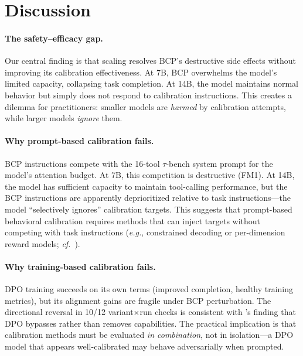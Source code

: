 \documentclass[11pt,a4paper]{article}
\newcommand{\taubench}{$\tau$-bench}
\newcommand{\eg}{\textit{e.g.}}
\newcommand{\cf}{\textit{cf.}}
\begin{document}
\section{Discussion}
\label{sec:discussion}

\paragraph{The safety--efficacy gap.}
Our central finding is that scaling resolves BCP's destructive side effects without improving its calibration effectiveness.
At 7B, BCP overwhelms the model's limited capacity, collapsing task completion.
At 14B, the model maintains normal behavior but simply does not respond to calibration instructions.
This creates a dilemma for practitioners: smaller models are \emph{harmed} by calibration attempts, while larger models \emph{ignore} them.

\paragraph{Why prompt-based calibration fails.}
BCP instructions compete with the 16-tool \taubench{} system prompt for the model's attention budget.
At 7B, this competition is destructive (FM1).
At 14B, the model has sufficient capacity to maintain tool-calling performance, but the BCP instructions are apparently deprioritized relative to task instructions---the model ``selectively ignores'' calibration targets.
This suggests that prompt-based behavioral calibration requires methods that can inject targets without competing with task instructions (\eg, constrained decoding or per-dimension reward models; \cf\ \citealt{khan2026decoding}).

\paragraph{Why training-based calibration fails.}
DPO training succeeds on its own terms (improved completion, healthy training metrics), but its alignment gains are fragile under BCP perturbation.
The directional reversal in 10/12 variant$\times$run checks is consistent with \citet{lee2024dpo_toxicity}'s finding that DPO bypasses rather than removes capabilities.
The practical implication is that calibration methods must be evaluated \emph{in combination}, not in isolation---a DPO model that appears well-calibrated may behave adversarially when prompted.
\end{document}
